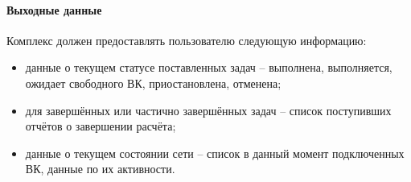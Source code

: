 \documentclass[a4paper,12pt]{report}
\numberwithin{equation}{section}
\begin{document}
\paragraph{Выходные данные}
Комплекс должен предоставлять пользователю следующую информацию:
\begin{itemize}
    \item данные о текущем статусе поставленных задач -- выполнена, выполняется, ожидает свободного ВК, приостановлена, отменена;
    \item для завершённых или частично завершённых задач -- список поступивших отчётов о завершении расчёта;
    \item данные о текущем состоянии сети -- список в данный момент подключенных ВК, данные по их активности.
\end{itemize}
\end{document}
